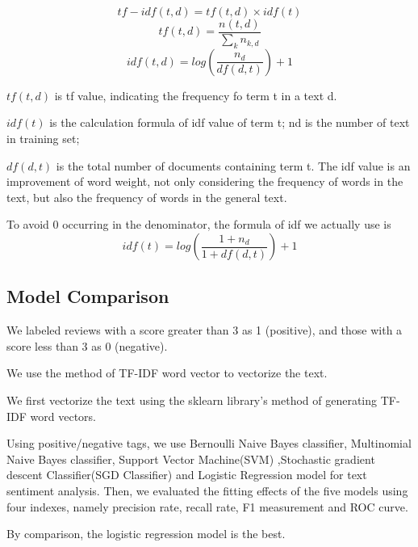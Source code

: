 \documentclass{mcmthesis}
\begin{document}
\begin{equation}
tf - idf(t,d)=tf(t,d) \times idf(t)
\end{equation}
\begin{equation}
tf(t,d)=\frac{n(t,d)}{\sum_k{n_{k,d}}}
\end{equation}
\begin{equation}
idf(t,d)=log(\frac{n_d}{df(d,t)})+1
\end{equation}

$tf(t, d)$ is tf value, indicating the frequency fo term t in a text d.

$idf(t)$ is the calculation formula of idf value of term t; nd is the number of text in training set;

$df(d, t)$ is the total number of documents containing term t. The idf value is an improvement
of word weight, not only considering the frequency of words in the text, but also the frequency
of words in the general text. 

To avoid 0 occurring in the denominator, the formula of idf we actually use is
\begin{equation}
idf(t)=log(\frac{1+n_d}{1+df(d,t)})+1
\end{equation}
\subsection{Model Comparison}

We labeled reviews with a score greater than 3 as 1 (positive), and those with a score less than 3 as 0 (negative).

We use the method of TF-IDF word vector to vectorize the text.

We first vectorize the text using the sklearn library's method of generating TF-IDF word vectors.

Using positive/negative tags, we use Bernoulli Naive Bayes classifier, Multinomial Naive Bayes classifier, Support Vector Machine(SVM) ,Stochastic gradient descent Classifier(SGD Classifier) and Logistic Regression model for text sentiment analysis.
Then, we evaluated the fitting effects of the five models using four indexes, namely precision rate, recall rate, F1 measurement and ROC curve.

By comparison, the logistic regression model is the best.
\end{document}
